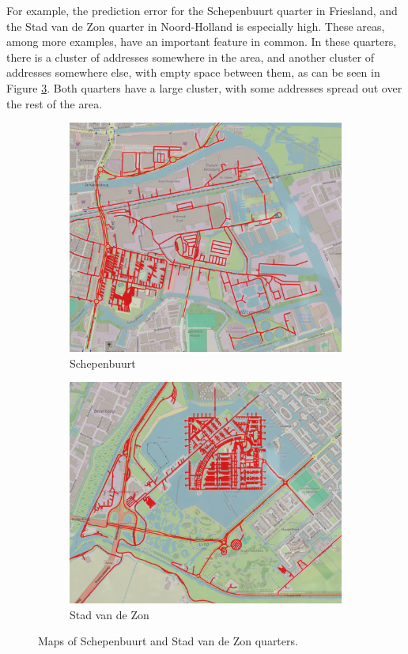 For example, the prediction error for the Schepenbuurt quarter in Friesland, and the Stad van de Zon quarter in Noord-Holland is
especially high. These areas, among more examples, have an important feature in common. In these quarters, there is a cluster of
addresses somewhere in the area, and another cluster of addresses somewhere else, with empty space between them, as can be seen in Figure \ref{fig:combined}.
Both quarters have a large cluster, with some addresses spread out over the rest of the area.
\begin{figure}[H]
	\centering
	\begin{subfigure}[b]{0.45\textwidth}
		\includegraphics[width=\textwidth]{Pictures/Schepenbuurt_quarter.png}
		\caption{Schepenbuurt}
		\label{fig:Schepenbuurt}
	\end{subfigure}
	\hfill
	\begin{subfigure}[b]{0.462\textwidth}
		\includegraphics[width=\textwidth]{Pictures/Stad_van_de_Zon_quarter.png}
		\caption{Stad van de Zon}
		\label{fig:StadvdZon}
	\end{subfigure}
	\caption{Maps of Schepenbuurt and Stad van de Zon quarters.}
	\label{fig:combined}
\end{figure}

